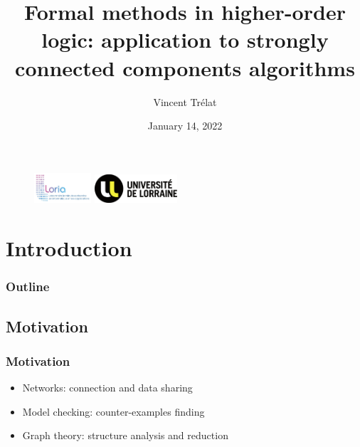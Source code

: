 \documentclass{beamer}
\title[Midterm presentation of the research course]{Formal methods in higher-order logic: application to strongly connected components algorithms}
\date{January 14, 2022}
\author[V. Trélat]{Vincent Trélat}
\institute[Mines Nancy]{\normalsize{École Nationale Supérieure des Mines de Nancy\\Département Informatique}}
\theoremstyle{definition}
\begin{document}
\begin{frame}
  \begin{figure}[t]
    \centering
    \hspace{1cm}
    \includegraphics[height=32pt]{img/logoloria.jpg}
    \hspace{1cm}
    \includegraphics[height=30pt]{img/logoUL.png}
  \end{figure}
  \titlepage
\end{frame}

\section{Introduction}
\begin{frame}
  \frametitle{Outline}
  \tableofcontents
\end{frame}
\subsection{Motivation}

\begin{frame}
  \frametitle{Motivation}
  \begin{itemize}
    \item Networks: connection and data sharing
    \vfill
    \item Model checking: counter-examples finding
    \vfill
    \item Graph theory: structure analysis and reduction
  \end{itemize}
\end{frame}
\end{document}
